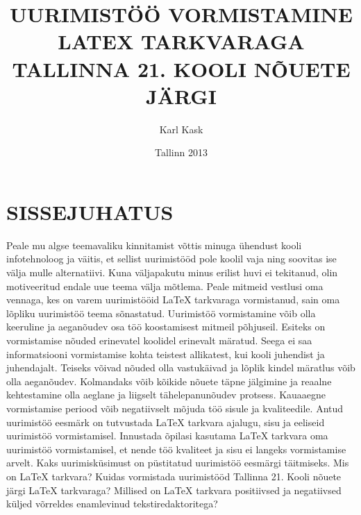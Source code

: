 \documentclass{21kuur}
\begin{document}
\title{UURIMIST\"{O}\"{O} VORMISTAMINE LATEX TARKVARAGA TALLINNA 21. KOOLI N\~{O}UETE J\"{A}RGI}
\author{Karl Kask}
\date{Tallinn 2013}
\maketitle

\chapter*{SISSEJUHATUS}
Peale mu algse teemavaliku kinnitamist v\~{o}ttis minuga \"{u}hendust kooli infotehnoloog ja v\"{a}itis, et sellist uurimist\"{o}\"{o}d pole koolil vaja ning soovitas ise v\"{a}lja mulle alternatiivi. Kuna v\"{a}ljapakutu minus erilist huvi ei tekitanud, olin motiveeritud endale uue teema v\"{a}lja m\~{o}tlema. Peale mitmeid vestlusi oma vennaga, kes on varem uurimist\"{o}\"{o}id LaTeX tarkvaraga vormistanud, sain oma l\~{o}pliku uurimist\"{o}\"{o} teema s\~{o}nastatud.
Uurimist\"{o}\"{o} vormistamine v\~{o}ib olla keeruline ja aegan\~{o}udev osa t\"{o}\"{o} koostamisest mitmeil p\~{o}hjuseil. Esiteks on vormistamise n\~{o}uded erinevatel koolidel erinevalt m\"{a}ratud. Seega ei saa informatsiooni vormistamise kohta teistest allikatest, kui kooli juhendist ja juhendajalt. Teiseks v\~{o}ivad n\~{o}uded olla vastuk\"{a}ivad ja l\~{o}plik kindel m\"{a}ratlus v\~{o}ib olla aegan\~{o}udev. Kolmandaks v\~{o}ib k\~{o}ikide n\~{o}uete t\"{a}pne j\"{a}lgimine ja reaalne kehtestamine olla aeglane ja liigselt t\"{a}helepanun\~{o}udev protsess. Kauaaegne vormistamise periood v\~{o}ib negatiivselt m\~{o}juda t\"{o}\"{o} sisule ja kvaliteedile.
Antud uurimist\"{o}\"{o} eesm\"{a}rk on tutvustada LaTeX tarkvara ajalugu, sisu ja eeliseid uurimist\"{o}\"{o} vormistamisel. Innustada \~{o}pilasi kasutama LaTeX tarkvara oma uurimist\"{o}\"{o} vormistamisel, et nende t\"{o}\"{o} kvaliteet ja sisu ei langeks vormistamise arvelt. 
Kaks uurimisk\"{u}simust on p\"{u}stitatud uurimist\"{o}\"{o} eesm\"{a}rgi t\"{a}itmiseks. Mis on LaTeX tarkvara? Kuidas vormistada uurimist\"{o}\"{o}d Tallinna 21. Kooli n\~{o}uete j\"{a}rgi LaTeX tarkvaraga? Millised on LaTeX tarkvara positiivsed ja negatiivsed k\"{u}ljed v\~{o}rreldes enamlevinud tekstiredaktoritega?
\end{document}
